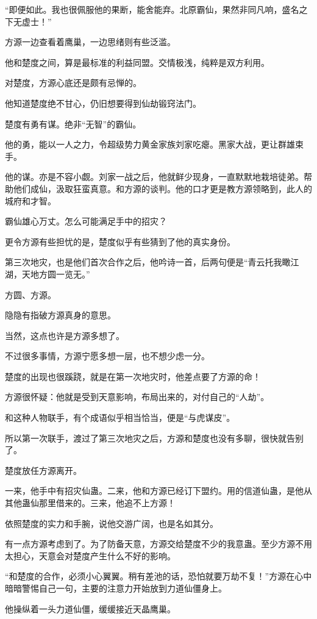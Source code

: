 \begin{this_body}
“即便如此。我也很佩服他的果断，能舍能弃。北原霸仙，果然非同凡响，盛名之下无虚士！”

方源一边查看着鹰巢，一边思绪则有些泛滥。

他和楚度之间，算是最标准的利益同盟。交情极浅，纯粹是双方利用。

对楚度，方源心底还是颇有忌惮的。

他知道楚度绝不甘心，仍旧想要得到仙劫锻窍法门。

楚度有勇有谋。绝非“无智”的霸仙。

他的勇，能以一人之力，令超级势力黄金家族刘家吃瘪。黑家大战，更让群雄束手。

他的谋。亦是不容小觑。刘家一战之后，他就鲜少现身，一直默默地栽培徒弟。帮助他们成仙，汲取狂蛮真意。和方源的谈判。他的口才更是教方源领略到，此人的城府和才智。

霸仙雄心万丈。怎么可能满足手中的招灾？

更令方源有些担忧的是，楚度似乎有些猜到了他的真实身份。

第三次地灾，也是他们首次合作之后，他吟诗一首，后两句便是“青云托我瞰江湖，天地方圆一览无。”

方圆、方源。

隐隐有指破方源真身的意思。

当然，这点也许是方源多想了。

不过很多事情，方源宁愿多想一层，也不想少虑一分。

楚度的出现也很蹊跷，就是在第一次地灾时，他差点要了方源的命！

方源很怀疑：他就是受到天意影响，布局出来的，对付自己的“人劫”。

和这种人物联手，有个成语似乎相当恰当，便是“与虎谋皮”。

所以第一次联手，渡过了第三次地灾之后，方源和楚度也没有多聊，很快就告别了。

楚度放任方源离开。

一来，他手中有招灾仙蛊。二来，他和方源已经订下盟约。用的信道仙蛊，是他从其他蛊仙那里借来的。三来，他追不上方源！

依照楚度的实力和手腕，说他交游广阔，也是名如其分。

有一点方源考虑到了。为了防备天意，方源交给楚度不少的我意蛊。至少方源不用太担心，天意会对楚度产生什么不好的影响。

“和楚度的合作，必须小心翼翼。稍有差池的话，恐怕就要万劫不复！”方源在心中暗暗警惕自己一句，主要的注意力开始放到力道仙僵身上。

他操纵着一头力道仙僵，缓缓接近天晶鹰巢。


\end{this_body}
